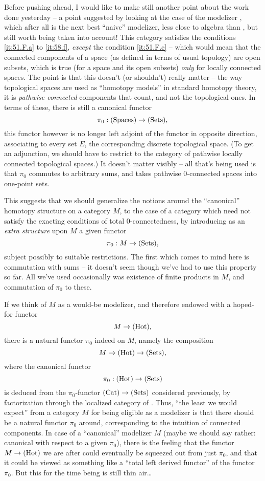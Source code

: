 \label{sec:59}%
Before pushing ahead, I would like to make still another point about
the work done yesterday -- a point suggested by looking at the case of
the modelizer \Spaces, which after all is the next best ``naive''
modelizer, less close to algebra than \Cat, but still worth being
taken into account! This category satisfies the conditions
\ref{it:51.F.a} to \ref{it:58.f}, \emph{except} the condition
\ref{it:51.F.c} -- which would mean that the connected components of a
space (as defined in terms of usual topology) are open subsets, which
is true (for a space and its open subsets) \emph{only} for locally
connected spaces. The point is that this doesn't (or shouldn't)
really matter -- the way topological spaces are used as
``homotopy models'' in standard homotopy theory, it is \emph{pathwise
  connected} components that count, and not the topological ones. In
terms of these, there is still a canonical functor
\[\pi_0:{(\mathrm{Spaces})}\to{\ensuremath{(\mathrm{Sets})}},\]
this functor however is no longer left adjoint of the functor in
opposite direction, associating to every set $E$, the corresponding
discrete topological space. (To get an adjunction, we should have to
restrict to the category of pathwise locally connected topological
spaces.) It doesn't matter visibly -- all that's being used is that
$\pi_0$ commutes to arbitrary sums, and takes pathwise $0$-connected
spaces into one-point sets.

This suggests that we should generalize the notions around the
``canonical'' homotopy structure on a category $M$, to the case of a
category which need not satisfy the exacting conditions of total
$0$-connectedness, by introducing as an \emph{extra structure} upon
$M$ a given functor
\[\pi_0:M\to{\ensuremath{(\mathrm{Sets})}},\]
subject possibly to suitable restrictions. The first which comes to
mind here is commutation with sums -- it doesn't seem though we've had
to use this property so far. All we've used occasionally was existence
of finite products in $M$, and commutation of $\pi_0$ to these.

If we think of $M$ as a would-be modelizer, and therefore endowed with
a hoped-for functor
\[M\to {\ensuremath{(\mathrm{Hot})}},\]
there is a natural functor $\pi_0$ indeed on $M$, namely the
composition
\[ M \to {\ensuremath{(\mathrm{Hot})}} \to {\ensuremath{(\mathrm{Sets})}},\]
where the canonical functor
\[\pi_0:{(\mathrm{Hot})}\to{\ensuremath{(\mathrm{Sets})}}\]
is deduced from the $\pi_0$-functor ${(\mathrm{Cat})}\to{\ensuremath{(\mathrm{Sets})}}$ considered
previously, by factorization through the localized category \Hot{} of
\Cat. Thus, ``the least we would expect'' from a category $M$ for
being eligible as a modelizer is that there should be a natural
functor $\pi_0$ around, corresponding to the intuition of connected
components. In case of a ``canonical'' modelizer $M$ (maybe we should
say rather: canonical with respect to a given $\pi_0$), there is the
feeling that the functor $M\to{\ensuremath{(\mathrm{Hot})}}$ we are after could eventually be
squeezed out from just $\pi_0$, and that it could be viewed as
something like a ``total left derived functor'' of the functor
$\pi_0$. But this for the time being is still thin air\ldots


